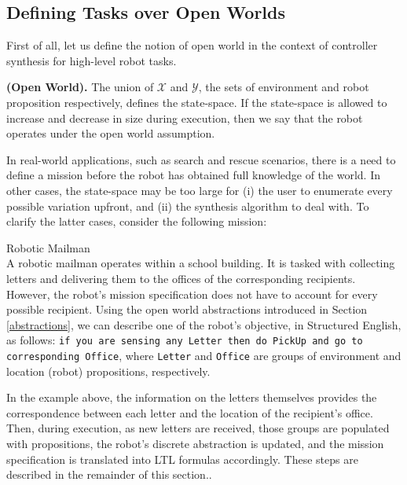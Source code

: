 \subsection{Defining Tasks over Open Worlds}

First of all, let us define the notion of open world in the context of controller synthesis for high-level robot tasks.

\begin{myDefinition}
	\textbf{(Open World).} The union of $\mathcal{X}$ and $\mathcal{Y}$, the sets of environment and robot proposition respectively, defines the state-space. If the state-space is allowed to increase and decrease in size during execution, then we say that the robot operates under the open world assumption.
\end{myDefinition}

In real-world applications, such as search and rescue scenarios, there is a need to define a mission before the robot has obtained full knowledge of the world. In other cases, the state-space may be too large for (i) the user to enumerate every possible variation upfront, and (ii) the synthesis algorithm to deal with. To clarify the latter cases, consider the following mission:

\begin{myExample}\label{Ex:mission1} Robotic Mailman\\
	A robotic mailman operates within a school building. It is tasked with collecting letters and delivering them to the offices of the corresponding recipients. However, the robot's mission specification does not have to account for every possible recipient. Using the open world abstractions introduced in Section \ref{abstractions}, we can describe one of the robot's objective, in Structured English, as follows: 
\texttt{if you are sensing any Letter then do PickUp and go to corresponding Office}, where \texttt{Letter} and \texttt{Office} are groups of environment and location (robot) propositions, respectively.
\end{myExample}

In the example above, the information on the letters themselves provides the correspondence between each letter and the location of the recipient's office. Then, during execution, as new letters are received, those groups are populated with propositions, the robot's discrete abstraction is updated, and the mission specification is translated into LTL formulas accordingly. These steps are described in the remainder of this section..

